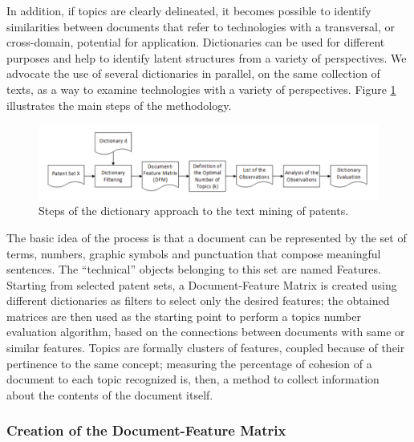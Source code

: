 \documentclass[]{book}
\theoremstyle{definition}
\theoremstyle{definition}
\theoremstyle{definition}
\theoremstyle{remark}
\begin{document}
In addition, if topics are clearly delineated, it becomes possible to
identify similarities between documents that refer to technologies with
a transversal, or cross-domain, potential for application. Dictionaries
can be used for different purposes and help to identify latent
structures from a variety of perspectives. We advocate the use of
several dictionaries in parallel, on the same collection of texts, as a
way to examine technologies with a variety of perspectives. Figure
\ref{fig:dictwf} illustrates the main steps of the methodology.

\begin{figure}

{\centering \includegraphics[width=0.8\linewidth]{_bookdown_files/figures/dictwf} 

}

\caption{Steps of the dictionary approach to the text mining of patents.}\label{fig:dictwf}
\end{figure}

The basic idea of the process is that a document can be represented by
the set of terms, numbers, graphic symbols and punctuation that compose
meaningful sentences. The ``technical'' objects belonging to this set
are named Features. Starting from selected patent sets, a
Document-Feature Matrix is created using different dictionaries as
filters to select only the desired features; the obtained matrices are
then used as the starting point to perform a topics number evaluation
algorithm, based on the connections between documents with same or
similar features. Topics are formally clusters of features, coupled
because of their pertinence to the same concept; measuring the
percentage of cohesion of a document to each topic recognized is, then,
a method to collect information about the contents of the document
itself.

\subsubsection*{Creation of the Document-Feature
Matrix}\label{creation-of-the-document-feature-matrix}
\end{document}
